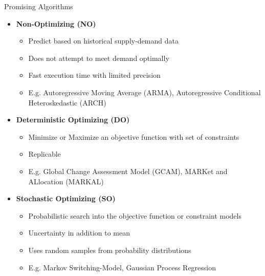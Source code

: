 \documentclass[final]{beamer}
\newlength{\onecolwid}
\newlength{\twocolwid}
\begin{document}
\begin{frame}[t]
\begin{columns}[t]
\begin{column}{\twocolwid}
\begin{columns}[t,totalwidth=\twocolwid]
\begin{column}{\onecolwid} %


\begin{block}{Promising Algorithms}
 \begin{itemize}
 	\setlength\itemsep{1.5em}
	\item \textbf{{\Large Non-Optimizing (NO)}}
	\begin{itemize}
		\setlength\itemsep{1em}
		\item {\large Predict based on historical supply-demand data}
		\item{\large  Does not attempt to meet demand optimally}
		\item {\large Fast execution time with limited precision}
		\item {\large E.g. Autoregressive Moving Average (ARMA), Autoregressive Conditional Heteroskedastic (ARCH)}
	\end{itemize}
	\item \textbf{{\Large Deterministic Optimizing (DO)}}
	\begin{itemize}
		\setlength\itemsep{1em}
		\item{\large  Minimize or Maximize an objective function with set of constraints}
		\item {\large Replicable}
		\item{\large  E.g. Global Change Assessment Model (GCAM), MARKet and ALlocation (MARKAL)}
	\end{itemize}
	\item \textbf{{\Large Stochastic Optimizing (SO)}}
	\begin{itemize}
		\setlength\itemsep{1em}
		\item {\large Probabilistic search into the objective function or constraint models}
		\item {\large Uncertainty in addition to mean}
		\item {\large Uses random samples from probability distributions}
		\item {\large E.g. Markov Switching-Model, Gaussian Process Regression}
	\end{itemize}
\end{itemize}


\end{block}




\end{column}
\end{columns}
\end{column}
\end{columns}
\end{frame}
\end{document}
